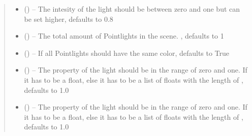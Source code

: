 \documentclass[letterpaper,10pt,english]{sphinxmanual}
\begin{document}
\begin{fulllineitems}
\begin{fulllineitems}
\begin{quote}
\begin{description}
\begin{itemize}
\item {} 
 (\sphinxstyleliteralemphasis{\sphinxupquote{, }}) -- The intesity of the light should be between zero and one but can be set higher, defaults to 0.8

\item {} 
 (\sphinxstyleliteralemphasis{\sphinxupquote{, }}) -- The total amount of Pointlights in the scene. , defaults to 1

\item {} 
 (\sphinxstyleliteralemphasis{\sphinxupquote{, }}) -- If all Pointlights should have the same color, defaults to True

\item {} 
 (\sphinxstyleliteralemphasis{\sphinxupquote{, }}) -- The  property of the light should be in the range of zero and one. If  it has to be a float, else it has to be a list of floats with the length of , defaults to 1.0

\item {} 
 (\sphinxstyleliteralemphasis{\sphinxupquote{, }}) -- The  property of the light should be in the range of zero and one. If  it has to be a float, else it has to be a list of floats with the length of , defaults to 1.0


\end{itemize}
\end{description}
\end{quote}
\end{fulllineitems}
\end{fulllineitems}
\end{document}
